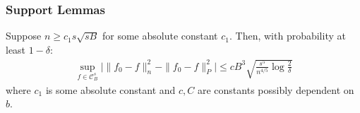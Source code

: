 \subsubsection{Support Lemmas}


\begin{lemma}
\label{lem:uniform_convergence}
Suppose $n \geq c_1 s\sqrt{sB}$ for some absolute constant $c_1$. Then, with probability at least $1-\delta$:
\begin{align*}
\sup_{f \in \mathcal{C}^s_B} \Big| \| f_0 - f \|^2_n - \|f_0 - f \|^2_P\Big| \leq
   c B^3 \sqrt{ \frac{s^5}{n^{4/5}} \log \frac{2}{\delta}}
\end{align*}
where $c_1$ is some absolute constant and $c,C$ are constants possibly dependent on $b$.
\end{lemma}

